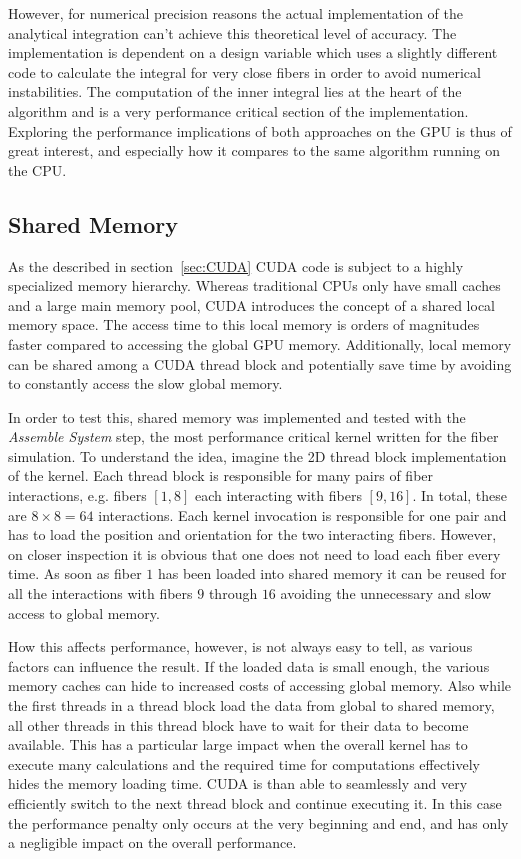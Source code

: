 \documentclass[a4paper,11pt]{kth-mag}
\begin{document}
However, for numerical precision reasons the actual implementation of the analytical integration can't achieve this theoretical level of accuracy. The implementation is dependent on a design variable which uses a slightly different code to calculate the integral for very close fibers in order to avoid numerical instabilities. The computation of the inner integral lies at the heart of the algorithm and is a very performance critical section of the implementation. Exploring the performance implications of both approaches on the GPU is thus of great interest, and especially how it compares to the same algorithm running on the CPU.

\subsection{Shared Memory}

As the described in section~\ref{sec:CUDA} CUDA code is subject to a highly specialized memory hierarchy. Whereas traditional CPUs only have small caches and a large main memory pool, CUDA introduces the concept of a shared local memory space. The access time to this local memory is orders of magnitudes faster compared to accessing the global GPU memory. Additionally, local memory can be shared among a CUDA thread block and potentially save time by avoiding to constantly access the slow global memory.

In order to test this, shared memory was implemented and tested with the \emph{Assemble System} step, the most performance critical kernel written for the fiber simulation. To understand the idea, imagine the 2D thread block implementation of the kernel. Each thread block is responsible for many pairs of fiber interactions, e.g. fibers $[1,8]$ each interacting with fibers $[9,16]$. In total, these are $8 \times 8 = 64$ interactions. Each kernel invocation is responsible for one pair and has to load the position and orientation for the two interacting fibers. However, on closer inspection it is obvious that one does not need to load each fiber every time. As soon as fiber $1$ has been loaded into shared memory it can be reused for all the interactions with fibers $9$ through $16$ avoiding the unnecessary and slow access to global memory.

How this affects performance, however, is not always easy to tell, as various factors can influence the result. If the loaded data is small enough, the various memory caches can hide to increased costs of accessing global memory. Also while the first threads in a thread block load the data from global to shared memory, all other threads in this thread block have to wait for their data to become available. This has a particular large impact when the overall kernel has to execute many calculations and the required time for computations effectively hides the memory loading time. CUDA is than able to seamlessly and very efficiently switch to the next thread block and continue executing it. In this case the performance penalty only occurs at the very beginning and end, and has only a negligible impact on the overall performance.
\end{document}
